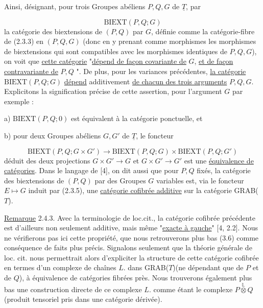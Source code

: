 Ainsi, désignant, pour trois Groupes abéliens $P,Q,G$ de $\underline{T}$, par

\begin{equation}\tag{2.4.1}
\mathrm{BIEXT}(P,Q;G)
\end{equation}
la catégorie des biextensions de $(P,Q)$ par $G$, définie comme la catégorie-fibre de (2.3.3) en $(P,Q,G)$ (donc en y prenant comme morphismes les morphismes de biextensions qui sont compatibles avec les morphismes identiques de $P,Q,G$), on voit que \underline{cette catégorie} "\underline{dépend de façon covariante de} $G$, \underline{et de façon contravariante de} $P,Q$ ". De plus, pour les variances précédentes, \underline{la catégorie} $\mathrm{BIEXT}(P,Q;G)$ \underline{dépend} additivement \underline{de chacun des trois arguments} $P,Q,G$. Explicitons la signification précise de cette assertion, pour l'argument $G$ par exemple :

a)   $\mathrm{BIEXT}(P,Q;0)$ est équivalent à la catégorie ponctuelle, et

b)   pour deux Groupes abéliens $G,G'$ de $\underline{T}$, le foncteur

\begin{equation}\tag{2.4.2}
\mathrm{BIEXT}(P,Q;G\times G') \longrightarrow \mathrm{BIEXT}(P,Q;G) \times \mathrm{BIEXT}(P,Q;G')
\end{equation}
déduit des deux projections $G \times G' \longrightarrow G$ et $G\times G' \longrightarrow G'$ est une \underline{équivalence de catégories}. Dans le langage de [4], on dit aussi que pour $P,Q$ fixés, la catégorie des biextensions de $(P,Q)$ par des Groupes $G$ variables est,
via le foncteur $E \longmapsto G$ induit par (2.3.5), une \underline{catégorie cofibrée additive} sur la catégorie GRAB(\underline{$T$}).

\underline{Remarque} 2.4.3. Avec la terminologie de loc.cit., la catégorie cofibrée précédente est d'ailleurs non seulement additive, mais même "\underline{exacte à gauche}" [4, 2.2]. Nous ne vérifierons pas ici cette propriété, que nous retrouverons plus bas (3.6) comme conséquence de faits plus précis. Signalons seulement que la théorie générale de loc. cit. nous permettrait alors d'expliciter la structure de cette catégorie cofibrée en termes d'un complexe de chaînes $L$. dans GRAB(\underline{$T$})(ne dépendant que de $P$ et de $Q$), à équivalence de catégories fibrées près. Nous trouverons également plus bas une construction directe de ce complexe $L$. comme étant le complexe $P \overset{\mathbb{L}}{\otimes} Q$ (produit tensoriel pris dans une catégorie dérivée).


